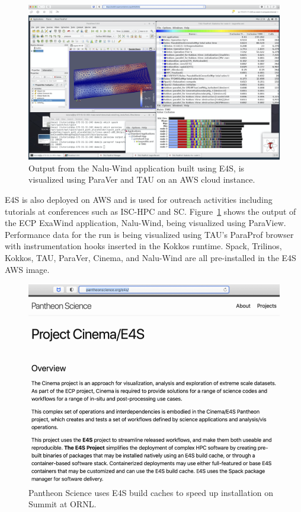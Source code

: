 \begin{figure}
        \centering
        \includegraphics[width=0.9\linewidth]{projects/2.3.5-Ecosystem/2.3.5.01-Ecosystem-SDK/E4S_Nalu_AWS}
        \caption{Output from the Nalu-Wind application built using E4S, is visualized using ParaVer and TAU on an AWS cloud instance.}
        \label{fig:E4SImageOnAWS}
\end{figure}

E4S is also deployed on AWS and is used for outreach activities including tutorials at conferences such as ISC-HPC and SC. Figure~\ref{fig:E4SImageOnAWS} shows the output of the ECP ExaWind application, Nalu-Wind, being visualized using ParaView. Performance data for the run is being visualized using TAU's ParaProf browser with instrumentation hooks inserted in the Kokkos runtime. Spack, Trilinos, Kokkos, TAU, ParaVer, Cinema, and Nalu-Wind are all pre-installed in the E4S AWS image. 

\begin{figure}
        \centering
        \includegraphics[width=0.78\linewidth]{projects/2.3.5-Ecosystem/2.3.5.01-Ecosystem-SDK/E4S_Pantheon_small}
        \caption{Pantheon Science uses E4S build caches to speed up installation on Summit at ORNL.}
        \label{fig:PantheonE4S}
\end{figure}

